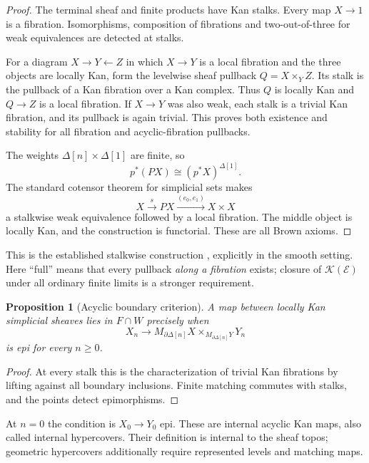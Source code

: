 \documentclass[12pt]{amsart}
\newtheorem{prop}[thm]{Proposition}
\theoremstyle{definition}
\theoremstyle{remark}
\numberwithin{equation}{section}
\newcommand{\E}{\mathcal E}
\newcommand{\KSh}{\mathcal K(\E)}
\begin{document}
\begin{proof}
The terminal sheaf and finite products have Kan stalks.
Every map $X\to1$ is a fibration. Isomorphisms, composition
of fibrations and two-out-of-three for weak equivalences
are detected at stalks.

For a diagram $X\to Y\leftarrow Z$ in which $X\to Y$ is a
local fibration and the three objects are locally Kan,
form the levelwise sheaf pullback $Q=X\times_Y Z$. Its
stalk is the pullback of a Kan fibration over a Kan
complex. Thus $Q$ is locally Kan and $Q\to Z$ is a local
fibration. If $X\to Y$ was also weak, each stalk is a
trivial Kan fibration, and its pullback is again trivial.
This proves both existence and stability for all
fibration and acyclic-fibration pullbacks.

The weights $\Delta[n]\times\Delta[1]$ are finite, so
\[
 p^*(PX)\cong(p^*X)^{\Delta[1]}.
\]
The standard cotensor theorem for simplicial sets makes
\[
 X\xrightarrow{s}PX\xrightarrow{(e_0,e_1)}X\times X
\]
a stalkwise weak equivalence followed by a local
fibration. The middle object is locally Kan, and the
construction is functorial. These are all Brown axioms.
\end{proof}

This is the established stalkwise construction
\cite[Section~1, pp.~420--421]{Brown1973}, explicitly
\cite[Proposition~4.18, p.~45]{NSS2015} in the smooth
setting. Here ``full'' means that every pullback
\emph{along a fibration} exists; closure of $\KSh$
under all ordinary finite limits is a stronger requirement.

\begin{prop}[Acyclic boundary criterion]\label{prop:boundary-criterion}
A map between locally Kan simplicial sheaves lies in
$F\cap W$ precisely when
\[
 X_n\longrightarrow
 M_{\partial\Delta[n]}X
 \times_{M_{\partial\Delta[n]}Y}Y_n
\]
is epi for every $n\ge0$.
\end{prop}

\begin{proof}
At every stalk this is the characterization of trivial
Kan fibrations by lifting against all boundary inclusions.
Finite matching commutes with stalks, and the points
detect epimorphisms.
\end{proof}

At $n=0$ the condition is $X_0\to Y_0$ epi. These are
internal acyclic Kan maps, also called internal hypercovers.
Their definition is internal to the sheaf topos; geometric
hypercovers additionally require represented levels and
matching maps.
\end{document}
